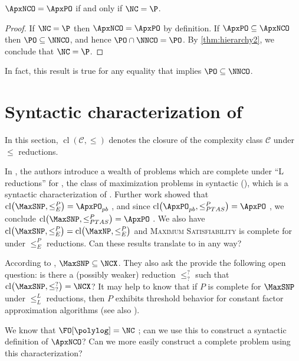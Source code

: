 \documentclass[]{article}
\newcommand{\cl}{\operatorname{cl}}
\let\originalleft\left
\let\originalright\right
\renewcommand{\left}{\mathopen{}\mathclose\bgroup\originalleft}
\renewcommand{\right}{\aftergroup\egroup\originalright}
\begin{document}
\begin{corollary}
  $\ApxNCO = \ApxPO$ if and only if $\NC = \P$.
\end{corollary}
\begin{proof}
  If $\NC = \P$ then $\ApxNCO = \ApxPO$ by definition.
  If $\ApxPO \subseteq \ApxNCO$ then $\PO \subseteq \NNCO$, and hence $\PO \cap \NNCO = \PO$.
  By \autoref{thm:hierarchy2}, we conclude that $\NC = \P$.
\end{proof}

In fact, this result is true for any equality that implies $\PO \subseteq \NNCO$.

\section{Syntactic characterization of \texorpdfstring{\ApxNCO}{ApxNCO}}

In this section, $\cl(\mathcal{C}, \leq)$ denotes the closure of the complexity class $\mathcal{C}$ under $\leq$ reductions.

In \cite{py91}, the authors introduce a wealth of problems which are complete under ``L reductions'' for \MaxSNP, the class of maximization problems in syntactic \NP{} (\SNP), which is a syntactic characterization of \NP.
Further work showed that $\cl\left(\MaxSNP, \leq^P_E\right) = \ApxPO_{pb}$ \cite[Theorem~1]{kmsv99}, and since $\cl\left(\ApxPO_{pb}, \leq^P_{PTAS}\right) = \ApxPO$ \cite{ct00}, we conclude $\cl\left(\MaxSNP, \leq^P_{PTAS}\right) = \ApxPO$ \cite{kmsv99}.
We also have $\cl\left(\MaxSNP, \leq^P_E\right) = \cl\left(\MaxNP, \leq^P_E\right)$ \cite[Theorem~2]{kmsv99} and \textsc{Maximum Satisfiability} is complete for \MaxNP{} under $\leq^P_E$ reductions.
Can these results translate to \NC{} in any way?

According to \cite[Theorem~9.1.3]{dsst97}, $\MaxSNP \subseteq \NCX$.
They also ask the provide the following open question: is there a (possibly weaker) reduction $\leq^?_?$ such that $\cl\left(\MaxSNP, \leq^?_?\right) = \NCX$?
It may help to know that if $P$ is complete for $\MaxSNP$ under $\leq^L_L$ reductions, then $P$ exhibits threshold behavior for constant factor \NC{} approximation algorithms \cite[Theorem~9]{sx95} (see also \cite[Theorem~9.2.3]{dsst97}).

\begin{todo}
  We know that $\FO[\polylog] = \NC$ \cite[Theorem~5.2]{immerman99}; can we use this to construct a syntactic definition of $\ApxNCO$?
  Can we more easily construct a complete problem using this characterization?
\end{todo}
\end{document}
